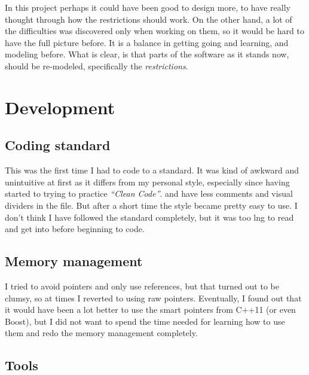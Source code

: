 \documentclass[../main.tex]{subfiles}
\begin{document}
In this project perhaps it could have been good to design more, to have really thought through how the restrictions should work. On the other hand, a lot of the difficulties was discovered only when working on them, so it would be hard to have the full picture before. It is a balance in getting going and learning, and modeling before. What is clear, is that parts of the software as it stands now, should be re-modeled, specifically the \textit{restrictions}.


\section{Development}

\subsection{Coding standard}
This was the first time I had to code to a standard. It was kind of awkward and unintuitive at first as it differs from my personal style, especially since having started to trying to practice \textit{``Clean Code''}. and have less comments and visual dividers in the file. But after a short time the style became pretty easy to use. I don't think I have followed the standard completely, but it was too lng to read and get into before beginning to code.

\subsection{Memory management}
I tried to avoid pointers and only use references, but that turned out to be clumsy, so at times I reverted to using raw pointers. Eventually, I found out that it would have been a lot better to use the smart pointers from C++11 (or even Boost), but I did not want to spend the time needed for learning how to use them and redo the memory management completely. 

\subsection{Tools}
\end{document}
